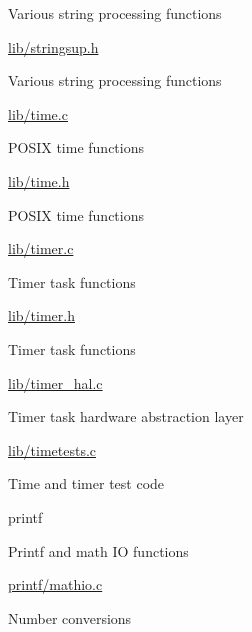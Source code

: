 \begin{DoxyItemize}
\begin{DoxyItemize}
\begin{DoxyItemize}
\item Various string processing functions
\end{DoxyItemize}
\item \hyperlink{stringsup_8h}{lib/stringsup.\+h}
\begin{DoxyItemize}
\item Various string processing functions
\end{DoxyItemize}
\item \hyperlink{time_8c}{lib/time.\+c}
\begin{DoxyItemize}
\item P\+O\+S\+IX time functions
\end{DoxyItemize}
\item \hyperlink{time_8h}{lib/time.\+h}
\begin{DoxyItemize}
\item P\+O\+S\+IX time functions
\end{DoxyItemize}
\item \hyperlink{timer_8c}{lib/timer.\+c}
\begin{DoxyItemize}
\item Timer task functions
\end{DoxyItemize}
\item \hyperlink{timer_8h}{lib/timer.\+h}
\begin{DoxyItemize}
\item Timer task functions
\end{DoxyItemize}
\item \hyperlink{timer__hal_8c}{lib/timer\+\_\+hal.\+c}
\begin{DoxyItemize}
\item Timer task hardware abstraction layer
\end{DoxyItemize}
\item \hyperlink{timetests_8c}{lib/timetests.\+c}
\begin{DoxyItemize}
\item Time and timer test code
\end{DoxyItemize}
\end{DoxyItemize}
\item printf
\begin{DoxyItemize}
\item Printf and math IO functions
\item \hyperlink{mathio_8c}{printf/mathio.\+c}
\begin{DoxyItemize}
\item Number conversions

\end{DoxyItemize}
\end{DoxyItemize}
\end{DoxyItemize}
